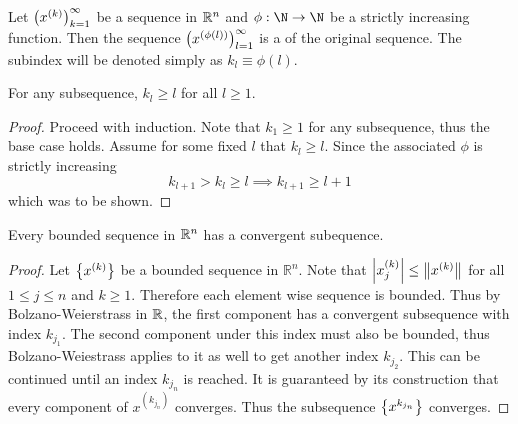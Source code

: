 \documentclass[../main.tex]{subfiles}
\begin{document}
\begin{definition}[Subsequence]
    Let $\qty(x^{(k)})_{k=1}^\infty$ be a sequence in $\mathbb{R}^n$ and $\phi : \N \to \N$ be a strictly increasing function. Then the sequence $\qty(x^{(\phi(l))})_{l=1}^\infty$ is a  of the original sequence. The subindex will be denoted simply as $k_l \equiv \phi(l)$.
\end{definition}

\begin{theorem}
    For any subsequence, $k_l \geq l$ for all $l \geq 1$.
\end{theorem}

\begin{proof}
    Proceed with induction. Note that $k_1 \geq 1$ for any subsequence, thus the base case holds. Assume for some fixed $l$ that $k_l \geq l$. Since the associated $\phi$ is strictly increasing
    \[
        k_{l+1} > k_l \geq l \implies k_{l+1} \geq l + 1
    \]
    which was to be shown.
\end{proof}

\begin{theorem}
    \label{thm:bolzano}
    Every bounded sequence in $\mathbb{R}^n$ has a convergent subequence.
\end{theorem}

\begin{proof}
    Let $\qty{x^{(k)}}$ be a bounded sequence in $\mathbb{R}^n$. Note that $\qty|x_j^{(k)}| \leq \norm{x^{(k)}}$ for all $1 \leq j \leq n$ and $k \geq 1$. Therefore each element wise sequence is bounded. Thus by Bolzano-Weierstrass in $\mathbb{R}$, the first component has a convergent subsequence with index $k_{j_1}$. The second component under this index must also be bounded, thus Bolzano-Weiestrass applies to it as well to get another index $k_{j_2}$. This can be continued until an index $k_{j_n}$ is reached. It is guaranteed by its construction that every component of $x^{(k_{j_n})}$ converges. Thus the subsequence $\qty{x^{k_{j_n}}}$ converges.
\end{proof}
\end{document}
